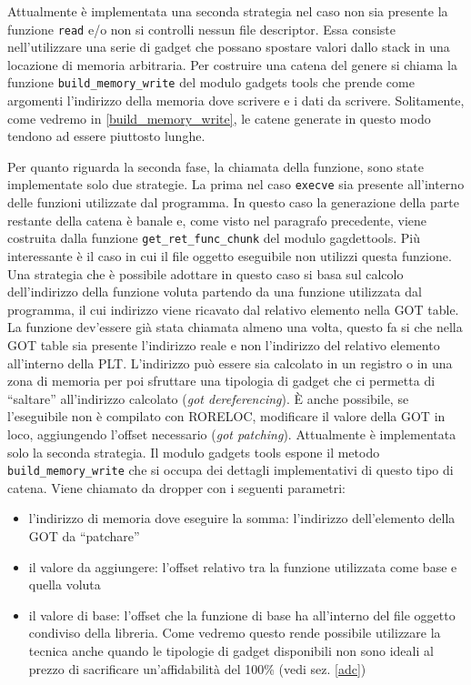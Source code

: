 Attualmente è implementata una seconda strategia nel caso non sia
presente la funzione \lstinline{read} e/o non si controlli nessun file
descriptor. Essa consiste nell'utilizzare una serie di gadget che
possano spostare valori dallo stack in una locazione di memoria
arbitraria.  Per costruire una catena del genere si chiama la funzione
\lstinline{build_memory_write} del modulo gadgets tools che prende
come argomenti l'indirizzo della memoria dove scrivere e i dati da
scrivere. Solitamente, come vedremo in \ref{build_memory_write}, le
catene generate in questo modo tendono ad essere piuttosto lunghe.


Per quanto riguarda la seconda fase, la chiamata della funzione, sono
state implementate solo due strategie. La prima nel caso
\lstinline{execve} sia presente all'interno delle funzioni utilizzate
dal programma. In questo caso la generazione della parte restante
della catena è banale e, come visto nel paragrafo precedente, viene
costruita dalla funzione \lstinline{get_ret_func_chunk} del modulo
gagdettools. Più interessante è il caso in cui il file oggetto
eseguibile non utilizzi questa funzione. Una strategia che è possibile
adottare in questo caso si basa sul calcolo dell'indirizzo della
funzione voluta partendo da una funzione utilizzata dal programma, il
cui indirizzo viene ricavato dal relativo elemento nella GOT table. La
funzione dev'essere già stata chiamata almeno una volta, questo fa si
che nella GOT table sia presente l'indirizzo reale e non l'indirizzo
del relativo elemento all'interno della PLT. L'indirizzo può essere
sia calcolato in un registro o in una zona di memoria per poi
sfruttare una tipologia di gadget che ci permetta di ``saltare''
all'indirizzo calcolato (\emph{got dereferencing}). È anche possibile,
se l'eseguibile non è compilato con RORELOC, modificare il valore
della GOT in loco, aggiungendo l'offset necessario (\emph{got
  patching}). Attualmente è implementata solo la seconda strategia. Il
modulo gadgets tools espone il metodo \lstinline{build_memory_write} che
si occupa dei dettagli implementativi di questo tipo di catena. Viene
chiamato da dropper con i seguenti parametri:

\begin{itemize}
  \item l'indirizzo di memoria dove eseguire la somma: l'indirizzo
    dell'elemento della GOT da ``patchare''

  \item il valore da aggiungere: l'offset relativo tra la funzione
    utilizzata come base e quella voluta

  \item il valore di base: l'offset che la funzione di base ha
    all'interno del file oggetto condiviso della libreria. Come
    vedremo questo rende possibile utilizzare la tecnica anche quando
    le tipologie di gadget disponibili non sono ideali al prezzo di
    sacrificare un'affidabilità del 100\% (vedi sez. \ref{adc})
\end{itemize}

